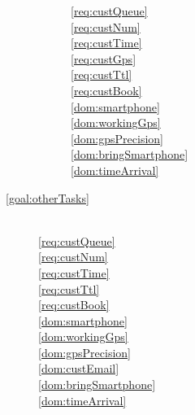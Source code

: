 \begin{description}
\begin{description}
            \ref{req:custQueue}  ~\\
            \ref{req:custNum}  ~\\
            \ref{req:custTime}  ~\\
            \ref{req:custGps}  ~\\
            \ref{req:custTtl}  ~\\
            \ref{req:custBook}  ~\\

            \ref{dom:smartphone}  ~\\
            \ref{dom:workingGps}  ~\\
            \ref{dom:gpsPrecision}  ~\\
            \ref{dom:bringSmartphone}  ~\\
            \ref{dom:timeArrival}  ~\\
        \end{description}


        \item[\ref{goal:otherTasks}]  ~\\

        \ref{req:custQueue}  ~\\
        \ref{req:custNum}   ~\\
        \ref{req:custTime}  ~\\
        \ref{req:custTtl}  ~\\
        \ref{req:custBook}  ~\\

        \ref{dom:smartphone}  ~\\
        \ref{dom:workingGps}  ~\\
        \ref{dom:gpsPrecision}  ~\\
        \ref{dom:custEmail}  ~\\
        \ref{dom:bringSmartphone}  ~\\
        \ref{dom:timeArrival}  ~\\



\end{description}

